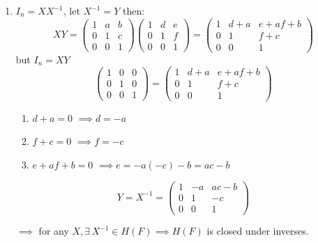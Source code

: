 \documentclass[12pt]{article}
\begin{document}
\begin{solution}
\begin{enumerate}
        \item $I_n = XX^{-1}$, let $X^{-1} = Y$ then: 
        \[ XY = \begin{pmatrix}
            1 & a & b \\ 0 & 1 & c \\ 0 & 0 & 1
        \end{pmatrix} \begin{pmatrix}
            1 & d & e \\ 0 & 1 & f \\ 0 & 0 & 1
        \end{pmatrix} = \begin{pmatrix}
            1 & d + a & e + af + b \\ 0 & 1 & f+c \\ 0 & 0 & 1
        \end{pmatrix}
        \]
        but $I_n = XY$ 
        \[ \begin{pmatrix}
            1 & 0 & 0 \\ 0 & 1 & 0 \\ 0 & 0 & 1
        \end{pmatrix} = \begin{pmatrix}
            1 & d + a & e + af + b \\ 0 & 1 & f+c \\ 0 & 0 & 1
        \end{pmatrix}
        \]

        \begin{enumerate}
            \item $d + a = 0$
            $\implies d = - a$
            \item $f + c = 0 $
            $\implies f = - c$
            \item $e + af + b = 0$
            $\implies e = - a(-c) - b = ac  - b$
        \end{enumerate}
        
        \[Y = X^{-1} = \begin{pmatrix}
            1 & -a & ac - b \\ 0 & 1 & -c \\ 0 & 0 & 1
        \end{pmatrix}\]

        $\implies$ for any $X, \exists \, X^{-1} \in H(F) \implies  H(F)$ is closed under inverses. 


\end{enumerate}
\end{solution}
\end{document}
